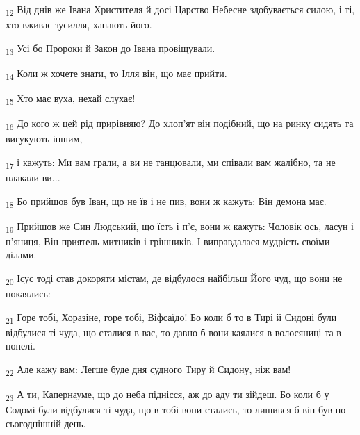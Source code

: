 \begin{tcolorbox}
\textsubscript{12} Від днів же Івана Христителя й досі Царство Небесне здобувається силою, і ті, хто вживає зусилля, хапають його.
\end{tcolorbox}
\begin{tcolorbox}
\textsubscript{13} Усі бо Пророки й Закон до Івана провіщували.
\end{tcolorbox}
\begin{tcolorbox}
\textsubscript{14} Коли ж хочете знати, то Ілля він, що має прийти.
\end{tcolorbox}
\begin{tcolorbox}
\textsubscript{15} Хто має вуха, нехай слухає!
\end{tcolorbox}
\begin{tcolorbox}
\textsubscript{16} До кого ж цей рід прирівняю? До хлоп'ят він подібний, що на ринку сидять та вигукують іншим,
\end{tcolorbox}
\begin{tcolorbox}
\textsubscript{17} і кажуть: Ми вам грали, а ви не танцювали, ми співали вам жалібно, та не плакали ви...
\end{tcolorbox}
\begin{tcolorbox}
\textsubscript{18} Бо прийшов був Іван, що не їв і не пив, вони ж кажуть: Він демона має.
\end{tcolorbox}
\begin{tcolorbox}
\textsubscript{19} Прийшов же Син Людський, що їсть і п'є, вони ж кажуть: Чоловік ось, ласун і п'яниця, Він приятель митників і грішників. І виправдалася мудрість своїми ділами.
\end{tcolorbox}
\begin{tcolorbox}
\textsubscript{20} Ісус тоді став докоряти містам, де відбулося найбільш Його чуд, що вони не покаялись:
\end{tcolorbox}
\begin{tcolorbox}
\textsubscript{21} Горе тобі, Хоразіне, горе тобі, Віфсаїдо! Бо коли б то в Тирі й Сидоні були відбулися ті чуда, що сталися в вас, то давно б вони каялися в волосяниці та в попелі.
\end{tcolorbox}
\begin{tcolorbox}
\textsubscript{22} Але кажу вам: Легше буде дня судного Тиру й Сидону, ніж вам!
\end{tcolorbox}
\begin{tcolorbox}
\textsubscript{23} А ти, Капернауме, що до неба піднісся, аж до аду ти зійдеш. Бо коли б у Содомі були відбулися ті чуда, що в тобі вони стались, то лишився б він був по сьогоднішній день.
\end{tcolorbox}
